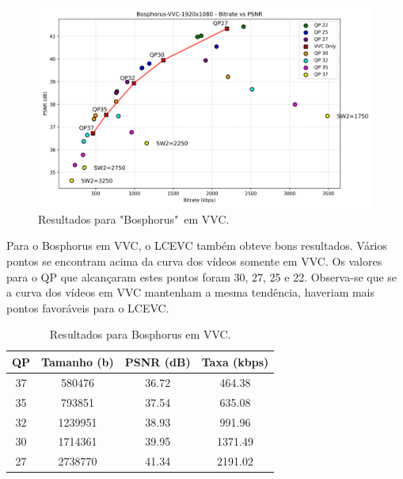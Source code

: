 \begin{figure}[h]
    \centering
    \includegraphics[width=1.0\textwidth]{img/Bosphorus-VVC.png}
    \caption{Resultados para "Bosphorus"\ em \acrshort{VVC}. \cite{uvg_dataset}}
    \label{fig:Bosphorus-VVC}
\end{figure}

Para o Bosphorus em \acrshort{VVC}, o \acrshort{LCEVC} também obteve bons resultados.
Vários pontos se encontram acima da curva dos vídeos somente em \acrshort{VVC}. Os 
valores para o QP que alcançaram estes pontos foram 30, 27, 25 e 22. Observa-se
que se a curva dos vídeos em \acrshort{VVC} mantenham a mesma tendência, haveriam
mais pontos favoráveis para o \acrshort{LCEVC}.

\begin{table}[h]
    \centering
    \begin{tabular}{|c|c|c|c|}
        \hline
        \textbf{QP} & \textbf{Tamanho (b)} & \textbf{PSNR (dB)} & \textbf{Taxa (kbps)} \\
        \hline
        37 & 580476 & 36.72 & 464.38 \\
        35 & 793851 & 37.54 & 635.08 \\
        32 & 1239951 & 38.93 & 991.96 \\
        30 & 1714361 & 39.95 & 1371.49 \\
        27 & 2738770 & 41.34 & 2191.02 \\
        \hline
    \end{tabular}
    \caption{Resultados para Bosphorus em VVC.}
    \label{tab:bosphorus-vvc}
\end{table}

